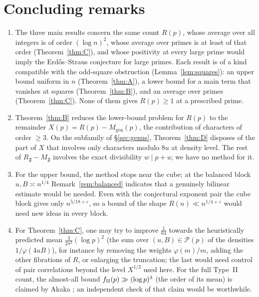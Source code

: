 \documentclass[11pt,reqno]{amsart}
\theoremstyle{definition}
\newcommand{\eps}{\varepsilon}
\newcommand{\cF}{\mathfrak F}
\newcommand{\cP}{\mathcal P}
\newcommand{\Mgen}{M_{\mathrm{gen}}}
\begin{document}
\section{Concluding remarks}\label{sec:concl}
\begin{enumerate}
\item The three main results concern the same count $R(p)$, whose
average over all integers is of order $(\log n)^2$, whose average over
primes is at least of that order (Theorem~\ref{thm:C}), and whose
positivity at every large prime would imply the Erd\H{o}s--Straus
conjecture for large primes.
Each result is of a kind compatible with the odd-square obstruction
(Lemma~\ref{lem:squares}): an upper bound uniform in $n$
(Theorem~\ref{thm:A}), a lower bound for a main term that vanishes at
squares (Theorem~\ref{thm:B}), and an average over primes
(Theorem~\ref{thm:C}).  None of them gives $R(p)\ge1$ at a prescribed
prime.
\item Theorem~\ref{thm:B} reduces the lower-bound problem for $R(p)$ to
the remainder $X(p)=R(p)-\Mgen(p)$, the contribution of characters of
order $\ge3$.  On the subfamily of \S\ref{sec:genus},
Theorem~\ref{thm:D} disposes of the part of $X$ that involves only
characters modulo $8u$ at density level.  The rest of $R_\cF-M_\cF$
involves the exact divisibility $w\mid p+u$; we have no method for it.
\item For the upper bound, the method stops near the cube; at the
balanced block $u,B\asymp n^{1/4}$ Remark~\ref{rem:balanced} indicates
that a genuinely bilinear estimate would be needed.  Even with the
conjectural exponent pair the cube block gives only $n^{5/18+\eps}$, so a
bound of the shape $R(n)\ll n^{1/4+\eps}$ would need new ideas in every
block.
\item For Theorem~\ref{thm:C}, one may try to improve $\frac1{64}$
towards the heuristically predicted mean $\frac3{2\pi^2}(\log p)^2$ (the
sum over $(u,B)\in\cP(p)$ of the densities $1/\varphi(4uB)$), for
instance by removing the weights $\varphi(m)/m$, adding the other
fibrations of $R$, or enlarging the truncation; the last would need
control of pair correlations beyond the level $X^{1/2}$ used here.  For
the full Type~II count, the almost-all bound $f_{\rm II}(p)\gg(\log
p)^3$ (the order of its mean) is claimed by Akaka \cite{Akaka}; an
independent check of that claim would be worthwhile.
\end{enumerate}
\end{document}
